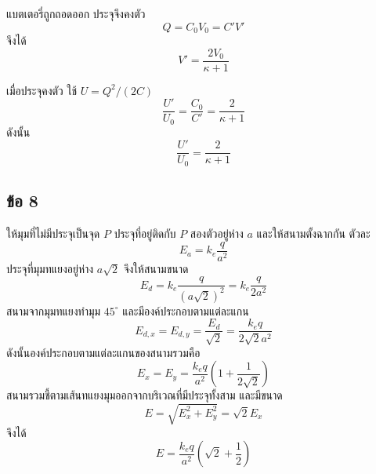 แบตเตอรี่ถูกถอดออก ประจุจึงคงตัว
\[
Q=C_0V_0=C'V'
\]
จึงได้
\[
\boxed{V'=\frac{2V_0}{\kappa+1}}
\]

เมื่อประจุคงตัว ใช้ $U=Q^2/(2C)$
\[
\frac{U'}{U_0}=\frac{C_0}{C'}
=\frac{2}{\kappa+1}
\]
ดังนั้น
\[
\boxed{\frac{U'}{U_0}=\frac{2}{\kappa+1}}
\]

\subsection*{ข้อ 8}
ให้มุมที่ไม่มีประจุเป็นจุด $P$ ประจุที่อยู่ติดกับ $P$ สองตัวอยู่ห่าง $a$ และให้สนามตั้งฉากกัน ตัวละ
\[
E_a=k_e\frac{q}{a^2}
\]
ประจุที่มุมทแยงอยู่ห่าง $a\sqrt2$ จึงให้สนามขนาด
\[
E_d=k_e\frac{q}{(a\sqrt2)^2}=k_e\frac{q}{2a^2}
\]
สนามจากมุมทแยงทำมุม $45^\circ$ และมีองค์ประกอบตามแต่ละแกน
\[
E_{d,x}=E_{d,y}=\frac{E_d}{\sqrt2}
=\frac{k_eq}{2\sqrt2a^2}
\]
ดังนั้นองค์ประกอบตามแต่ละแกนของสนามรวมคือ
\[
E_x=E_y=\frac{k_eq}{a^2}\left(1+\frac{1}{2\sqrt2}\right)
\]
สนามรวมชี้ตามเส้นทแยงมุมออกจากบริเวณที่มีประจุทั้งสาม และมีขนาด
\[
E=\sqrt{E_x^2+E_y^2}=\sqrt2E_x
\]
จึงได้
\[
\boxed{E=\frac{k_eq}{a^2}\left(\sqrt2+\frac12\right)}
\]
